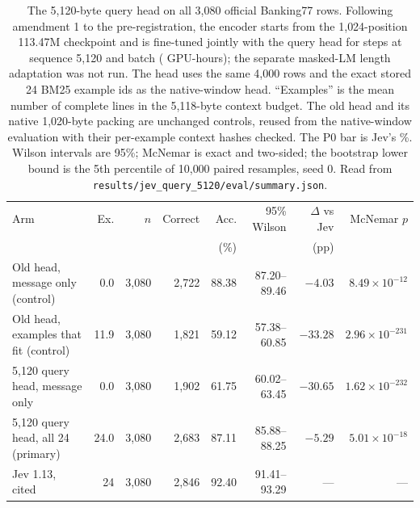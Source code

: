 \begin{table}[htbp]
\centering
\footnotesize
\caption{The 5{,}120-byte query head on all 3{,}080 official Banking77 rows.
Following amendment 1 to the pre-registration, the encoder starts from the
1{,}024-position 113.47M checkpoint and is fine-tuned jointly with the query
head for \LenSteps{} steps at sequence 5{,}120 and batch \LenBatch{}
(\LenHeadHours{} GPU-hours); the separate masked-LM length adaptation was not
run. The head uses the same 4{,}000 rows and the exact stored 24 BM25 example
ids as the native-window head. ``Examples'' is the mean number of complete lines
in the 5{,}118-byte context budget. The old head and its native 1{,}020-byte
packing are unchanged controls, reused from the native-window evaluation with
their per-example context hashes checked. The P0 bar is Jev's \LenJevPct\%.
Wilson intervals are 95\%; McNemar is exact and two-sided; the bootstrap lower
bound is the 5th percentile of 10{,}000 paired resamples, seed 0. Read from
\texttt{results/jev\_query\_5120/eval/summary.json}.}
\label{tab:len5120}
\setlength{\tabcolsep}{2pt}
\begin{tabular}{@{}lrrrrrrr@{}}
\toprule
Arm & Ex. & $n$ & Correct & Acc. & 95\% Wilson & $\Delta$ vs Jev & McNemar $p$ \\
 & & & & (\%) & & (pp) & \\
\midrule
Old head, message only (control) & 0.0 & 3{,}080 & 2{,}722 & 88.38 & 87.20--89.46 & $-4.03$ & $8.49\times10^{-12}$ \\
Old head, examples that fit (control) & 11.9 & 3{,}080 & 1{,}821 & 59.12 & 57.38--60.85 & $-33.28$ & $2.96\times10^{-231}$ \\
5{,}120 query head, message only & 0.0 & 3{,}080 & 1{,}902 & 61.75 & 60.02--63.45 & $-30.65$ & $1.62\times10^{-232}$ \\
5{,}120 query head, all 24 (primary) & 24.0 & 3{,}080 & 2{,}683 & 87.11 & 85.88--88.25 & $-5.29$ & $5.01\times10^{-18}$ \\
Jev 1.13, cited & 24 & 3{,}080 & 2{,}846 & 92.40 & 91.41--93.29 & --- & --- \\
\bottomrule
\end{tabular}
\end{table}
